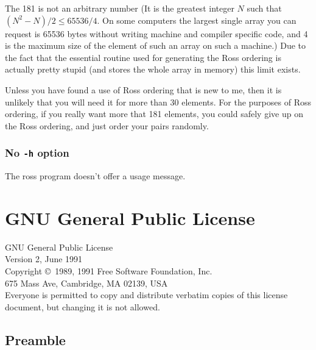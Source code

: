 \documentclass[%
	11pt,
        a4paper,
        twoside]{workrep}
\newcommand*{\prg}[1]{\textsf{#1}}		%
\newcommand*{\opt}[1]{\texttt{#1}}		%
\begin{document}
The 181 is not an arbitrary number (It is the greatest integer $N$
such that $(N^2-N)/2 \le 65536/4$.  On some computers the largest
single array you can request is 65536 bytes without writing machine
and compiler specific code, and 4 is the maximum size of the element
of such an array on such a machine.)  Due to the fact that
the essential routine used for generating the Ross ordering is actually
pretty stupid (and stores the whole array in memory) this limit exists.

Unless you have found a use of Ross ordering that is new to me, then
it is unlikely that you will need it for more than 30 elements.  For
the purposes of Ross ordering, if you really want more that 181
elements, you could safely give up on the Ross ordering, and just
order your pairs randomly.

\subsection{No \opt{-h} option}

The \prg{ross} program doesn't offer a usage message.



\appendix\renewcommand{\chaptername}{Appendix}
\chapter{GNU General Public License}\label{app:gnu}

\begin{center}
{\large GNU General Public License}\\
Version 2, June 1991\\[.6ex]
Copyright \copyright~1989, 1991 Free Software Foundation, Inc.\\
675 Mass Ave, Cambridge, MA 02139, USA\\[.2ex]
Everyone is permitted to copy and distribute verbatim copies
of this license document, but changing it is not allowed.
\end{center}

\section{Preamble}
\end{document}
